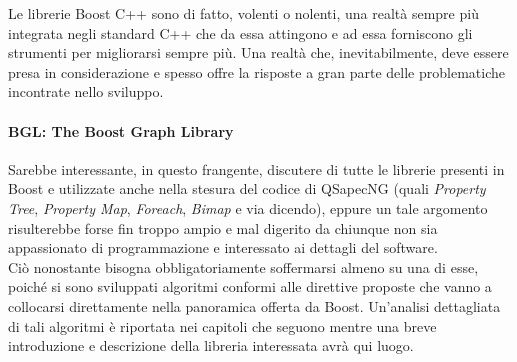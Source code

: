 Le librerie Boost C++ sono di fatto, volenti o nolenti, una realtà sempre più integrata negli standard C++ che da essa attingono e ad essa forniscono gli strumenti per migliorarsi sempre più. Una realtà che, inevitabilmente, deve essere presa in considerazione e spesso offre la risposte a gran parte delle problematiche incontrate nello sviluppo.

\paragraph{BGL: The Boost Graph Library}
Sarebbe interessante, in questo frangente, discutere di tutte le librerie presenti in Boost e utilizzate anche nella stesura del codice di QSapecNG (quali \textit{Property Tree}, \textit{Property Map}, \textit{Foreach}, \textit{Bimap} e via dicendo), eppure un tale argomento risulterebbe forse fin troppo ampio e mal digerito da chiunque non sia appassionato di programmazione e interessato ai dettagli del software.\\
Ciò nonostante bisogna obbligatoriamente soffermarsi almeno su una di esse, poiché si sono sviluppati algoritmi conformi alle direttive proposte che vanno a collocarsi direttamente nella panoramica offerta da Boost. Un'analisi dettagliata di tali algoritmi è riportata nei capitoli che seguono mentre una breve introduzione e descrizione della libreria interessata avrà qui luogo.

